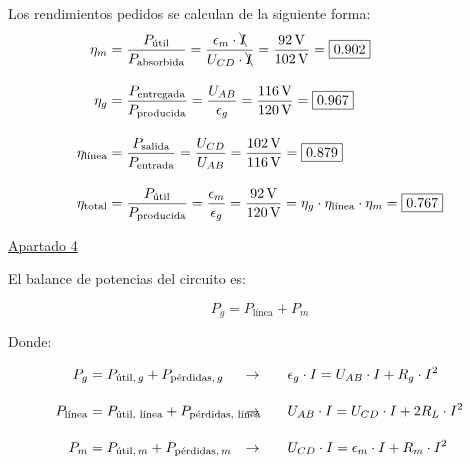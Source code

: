 \documentclass[10pt]{article}
\begin{document}
\vspace{5mm}

Los rendimientos pedidos se calculan de la siguiente forma:
\begin{align*}
    \eta_m &= \frac{P_{\textrm{útil}}}{P_{\textrm{absorbida}}} = \frac{\epsilon_m \cdot \bcancel{I}}{U_{CD} \cdot \bcancel{I}} = \frac{\qty{92}{\volt}}{\qty{102}{\volt}}  = \boxed{0.902}\\[10pt]
    \eta_g &= \frac{P_{\textrm{entregada}}}{P_{\textrm{producida}}} = \frac{U_{AB}}{\epsilon_g} = \frac{\qty{116}{\volt}}{\qty{120}{\volt}} = \boxed{0.967}\\[10pt]
    \eta_{\textrm{línea}} &= \frac{P_{\textrm{salida}}}{P_{\textrm{entrada}}} = \frac{U_{CD}}{U_{AB}} = \frac{\qty{102}{\volt}}{\qty{116}{\volt}} = \boxed{0.879}\\[10pt]
    \eta_{\textrm{total}} &= \frac{P_{\textrm{útil}}}{P_{\textrm{producida}}} = \frac{\epsilon_m}{\epsilon_g} = \frac{\qty{92}{\volt}}{\qty{120}{\volt}} = \eta_g \cdot \eta_{\textrm{línea}} \cdot \eta_m = \boxed{0.767}
\end{align*}

\vspace{6mm}

\underline{Apartado 4}

\vspace{5mm}

El balance de potencias del circuito es:

\[
  P_{g} = P_{\textrm{línea}} + P_{m} 
\]

Donde:

\begin{align*}
    P_{g} &= P_{\textrm{útil}, \, g} + P_{\textrm{pérdidas}, \, g} &\rightarrow  \qquad &\epsilon_g \cdot I = U_{AB} \cdot I + R_g \cdot I^2 \\[10pt]
    P_{\textrm{línea}} &= P_{\textrm{útil, línea}} + P_{\textrm{pérdidas, línea}} \hspace{-20mm} &\rightarrow \qquad &U_{AB} \cdot I = U_{CD} \cdot I + 2 R_L \cdot I^2\\[10pt]
    P_{m} &= P_{\textrm{útil}, \, m} + P_{\textrm{pérdidas}, \, m} &\rightarrow  \qquad &U_{CD} \cdot I = \epsilon_m \cdot I + R_m \cdot I^2 
\end{align*}
\end{document}
